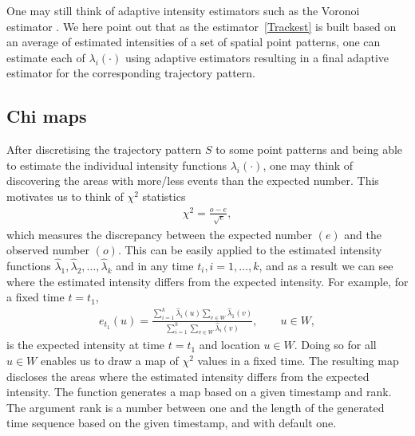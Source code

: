 \documentclass[article]{jss}
\begin{document}
One may still think of adaptive intensity estimators such as the Voronoi estimator \citep{Ord78,BSV10}. We here point out that as the estimator~\ref{Trackest} is built based on an average of estimated intensities of a set of spatial point patterns, one can estimate each of $\lambda_i(\cdot)$ using adaptive estimators resulting in a final adaptive estimator for the corresponding trajectory pattern.
  \subsection{Chi maps}
  After discretising the trajectory pattern $S$ to some point patterns and being able to estimate the individual intensity functions $\lambda_i(\cdot)$, one may think of discovering the areas with more/less events than the expected number. This motivates us to think of $\chi^2$ statistics 
  \begin{eqnarray}\label{chistat}
  \chi^2 =\frac{o-e}{\sqrt[]{e}},
  \end{eqnarray}
  which measures the discrepancy between the expected number $(e)$ and the observed number $(o)$. This can be easily applied to the estimated intensity functions $\widehat{\lambda}_1,\widehat{\lambda}_2,\ldots,\widehat{\lambda}_k$ and in any time $t_i, i=1,\ldots,k$, and as a result we can see where the estimated intensity differs from the expected intensity. For example, for a fixed time $t=t_1$,
  \begin{eqnarray*}
  e_{t_1}(u)=\frac{\sum\limits_{i=1}^k \widehat{\lambda}_i(u) \sum\limits_{v \in W} \widehat{\lambda}_1(v)}{\sum\limits_{i=1}^{k}\sum\limits_{v \in W} \widehat{\lambda}_i (v)}, \qquad u \in W,
  \end{eqnarray*}
  is the expected intensity at time $t=t_1$ and location $u \in W$. Doing so for all $u \in W$ enables us to draw a map of $\chi^2$ values in a fixed time. The resulting map discloses the areas where the estimated intensity differs from the expected intensity. The function  generates a map based on a given timestamp and rank. The argument rank is a number between one and the length of the generated time sequence based on the given timestamp, and with default one.
  
\end{document}
